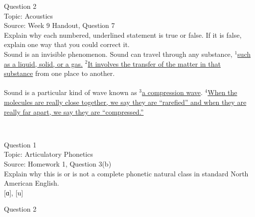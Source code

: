 \documentclass[12pt]{article}
\begin{document}
\newpage

{\large Question 2}\\

Topic: Acoustics\\
Source: Week 9 Handout, Question 7\\

Explain why each numbered, underlined statement is true or false. If it is false, explain one way that you could correct it.\\

Sound is an invisible phenomenon. Sound can travel through any substance, $^1$\ul{such as a liquid, solid, or a gas.} $^2$\ul{It involves the transfer of the matter in that substance} from one place to another.\\\\Sound is a particular kind of wave known as $^3$\ul{a compression wave}. $^4$\ul{When the molecules are really close together, we say they are ``rarefied'' and when they are really far apart, we say they are ``compressed.''}


\newpage

\begin{center}
\textbf{{\color{red}{\HUGE END OF EXAM}}}\\

\end{center}
\newpage

\begin{center}
\textbf{{\color{blue}{\HUGE START OF EXAM\\}}}

\textbf{{\color{blue}{\HUGE Student ID: 98910\\}}}

\textbf{{\color{blue}{\HUGE 4:20\\}}}

\end{center}
\newpage

{\large Question 1}\\

Topic: Articulatory Phonetics\\
Source: Homework 1, Question 3(b)\\

Explain why this is or is not a complete phonetic natural class in standard North American English.\\

{[ɑ]}, {[u]}


\newpage

{\large Question 2}\\
\end{document}
